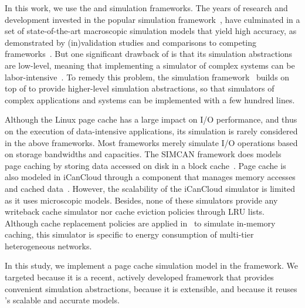 In this  work, we use the \simgrid and \wrench simulation
frameworks.  The years of research and development invested in
the popular \simgrid simulation framework~\cite{casanova2014simgrid}, have
culminated in a set of state-of-the-art macroscopic simulation
models that yield high accuracy, as demonstrated by
(in)validation studies and comparisons to competing
frameworks~\cite{smpi_validity, velhoTOMACS2013, simutool_09,
nstools_07, lebre2015, pouilloux:hal-01197274,
smpi_tpds2017,  7885814, 8048921, 7384330}.  But one
significant drawback of \simgrid is that its simulation
abstractions are low-level, meaning that implementing a
simulator of complex systems can be
labor-intensive~\cite{kecskemeti_2014}. To remedy this problem,
the \wrench simulation framework~\cite{casanova2020fgcs}
builds on top of \simgrid to provide higher-level simulation
abstractions, so that simulators of complex applications and
systems can be implemented with a few hundred lines.

Although the Linux page cache has a large impact on I/O
performance, and thus on the execution of data-intensive
applications, its simulation is rarely considered in the above
frameworks.  Most frameworks merely simulate I/O operations
based on storage bandwidths and capacities.  The SIMCAN
framework does models page caching by storing data accessed on
disk in a block cache~\cite{nunez2012simcan}.  Page cache is
also modeled in iCanCloud through a component that manages
memory accesses and cached data~\cite{nunez2012icancloud}.
However, the scalability of the iCanCloud simulator is limited
as it uses microscopic models.  Besides, none
of these simulators provide any writeback cache simulator nor
cache eviction policies through LRU lists.  Although cache
replacement policies are applied in~\cite{xu2018saving} to
simulate in-memory caching, this simulator is specific to
energy consumption of multi-tier heterogeneous networks.

In this study, we implement a page cache simulation model in the
\wrench framework. We targeted \wrench because it is a recent,
actively developed framework that provides convenient simulation
abstractions, because it is extensible, and because it reuses
\simgrid's scalable and accurate models.
